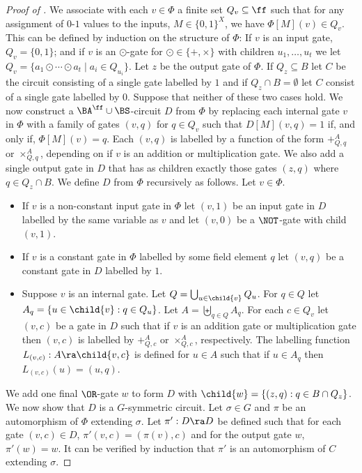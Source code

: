 \documentclass{toc}
\begin{document}
\begin{proof}[Proof of ]
  We associate with each $v \in \Phi$ a finite set $Q_v \subseteq \ff$
  such that for any assignment of $0$-$1$ values to the inputs, $M \in
  \{0,1\}^X$, we have $\Phi[M](v) \in Q_v$.  This can be defined by
  induction on the structure of $\Phi$: If $v$ is an input gate, $Q_v
  = \{0,1\}$; and if $v$ is an $\odot$-gate for $\odot \in
  \{+,\times\}$ with children $u_1,\ldots,u_t$  we let $Q_v = \{
  a_1\odot \cdots \odot a_t \mid a_i \in Q_{u_i} \}$.
  Let $z$ be the output gate of $\Phi$. If $Q_z \subseteq B$ let $C$ be the
  circuit consisting of a single gate labelled by $1$ and if $Q_z \cap B =
  \emptyset$ let $C$ consist of a single gate labelled by $0$. Suppose that
  neither of these two cases hold.
  We now construct a $\BA^{\ff}\cup \BS$-circuit $D$ from $\Phi$ by replacing
  each internal gate $v$ in $\Phi$ with a family of gates $(v, q)$ for $q \in
  Q_v$ such that $D[M](v, q) = 1$ if, and only if, $\Phi[M](v) = q$. Each $(v,
  q)$ is labelled by a function of the form $+^A_{Q, q}$ or $\times^A_{Q, q}$,
  depending on if $v$ is an addition or multiplication gate. We also add a
  single output gate in $D$ that has as children exactly those gates $(z, q)$
  where $q \in Q_z \cap B$. We define $D$ from $\Phi$ recursively as follows.
  Let $v \in \Phi$.
  \begin{itemize}
  \item If $v$ is a non-constant input gate in $\Phi$ let $(v, 1)$ be an input
    gate in $D$ labelled by the same variable as $v$ and let $(v, 0)$ be a
    $\NOT$-gate with child $(v, 1)$.
  \item If $v$ is a constant gate in $\Phi$ labelled by some field element $q$
    let $(v, q)$ be a constant gate in $D$ labelled by $1$.
  \item Suppose $v$ is an internal gate. Let $Q = \bigcup_{u \in \child{v}}Q_u$.
    For $q \in Q$ let $A_q = \{u \in \child{v} : q \in Q_u\}$. Let $A =
    \biguplus_{q \in Q}A_q$. For each $c \in Q_v$ let $(v, c)$ be a gate in $D$
    such that if $v$ is an addition gate or multiplication gate then $(v, c)$ is
    labelled by $+^A_{Q, c}$ or $\times^A_{Q, c}$, respectively. The labelling
    function $L_{(v, c)} : A \ra \child{v, c}$ is defined for $u \in A$ such
    that if $u \in A_q$ then $L_{(v, c)} (u) = (u, q)$.
  \end{itemize}
  We add one final $\OR$-gate $w$ to form $D$ with $\child{w} = \{(z, q) : q \in
  B \cap Q_z\}$.
  We now show that $D$ is a $G$-symmetric circuit. Let $\sigma \in G$ and $\pi$
  be an automorphism of $\Phi$ extending $\sigma$. Let $\pi' : D \ra D$ be
  defined such that for each gate $(v, c) \in D$, $\pi' (v, c) = (\pi(v), c)$
  and for the output gate $w$, $\pi'(w) = w$. It can be verified by induction
  that $\pi'$ is an automorphism of $C$ extending $\sigma$.
  

\end{proof}
\end{document}
